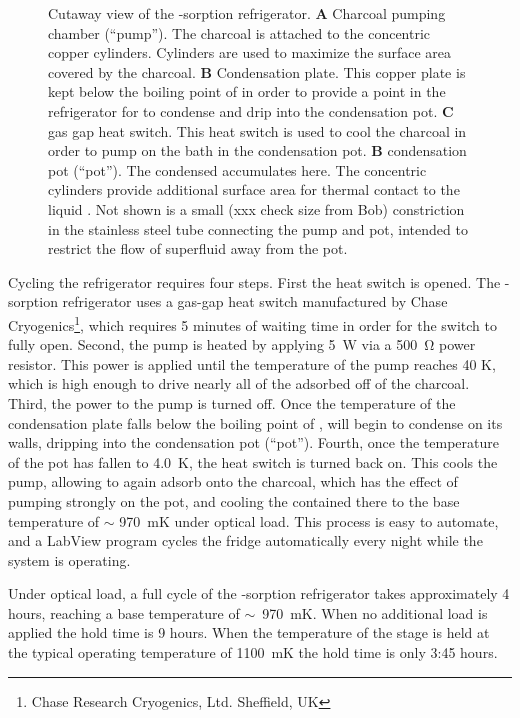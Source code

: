 \begin{figure}
\caption{Cutaway view of the -sorption refrigerator. \textbf{A} Charcoal pumping chamber (``pump''). The charcoal is attached to the concentric copper cylinders. Cylinders are used to maximize the surface area covered by the charcoal. \textbf{B} Condensation plate. This copper plate is kept below the boiling point of  in order to provide a point in the refrigerator for  to condense and drip into the condensation pot. \textbf{C}  gas gap heat switch. This heat switch is used to cool the charcoal in order to pump on the  bath in the condensation pot. \textbf{B}  condensation pot (``pot''). The condensed  accumulates here. The concentric cylinders provide additional surface area for thermal contact to the liquid . Not shown is a small (xxx check size from Bob) constriction in the stainless steel tube connecting the pump and pot, intended to restrict the flow of superfluid  away from the pot.}
\label{fig:he4sorp}
\end{figure}

Cycling the refrigerator requires four steps.
First the heat switch is opened.
The -sorption refrigerator uses a  gas-gap heat switch manufactured by Chase Cryogenics\footnote{Chase Research Cryogenics, Ltd. Sheffield, UK}, which requires 5 minutes of waiting time in order for the switch to fully open.
Second, the pump is heated by applying \SI{5}{\W} via a \SI{500}{\ohm} power resistor.
This power is applied until the temperature of the pump reaches 40 K, which is high enough to drive nearly all of the adsorbed  off of the charcoal.
Third, the power to the pump is turned off.
Once the temperature of the condensation plate falls below the boiling point of ,  will begin to condense on its walls, dripping into the  condensation pot (``pot'').
Fourth, once the temperature of the pot has fallen to 4.0~K, the heat switch is turned back on.
This cools the pump, allowing  to again adsorb onto the charcoal, which has the effect of pumping strongly on the pot, and cooling the  contained there to the base temperature of $\sim$ 970~mK under optical load.
This process is easy to automate, and a LabView program cycles the fridge automatically every night while the system is operating.

Under optical load, a full cycle of the -sorption refrigerator takes approximately 4 hours, reaching a base temperature of $\sim$~970~mK.
When no additional load is applied the hold time is 9 hours.
When the temperature of the stage is held at the typical operating temperature of 1100~mK the hold time is only 3:45 hours.

